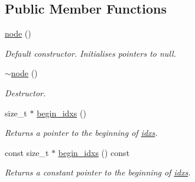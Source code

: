 \subsection*{Public Member Functions}
\begin{DoxyCompactItemize}
\item 
\mbox{\label{structphysim_1_1structures_1_1octree_1_1node_a635b012328b2533bb5ed7426a405629c}} 
\hyperlink{structphysim_1_1structures_1_1octree_1_1node_a635b012328b2533bb5ed7426a405629c}{node} ()
\begin{DoxyCompactList}\small\item\em Default constructor. Initialises pointers to null. \end{DoxyCompactList}\item 
\mbox{\label{structphysim_1_1structures_1_1octree_1_1node_a3a4c3b8ddc5369ddef78d72bc8f5782b}} 
\hyperlink{structphysim_1_1structures_1_1octree_1_1node_a3a4c3b8ddc5369ddef78d72bc8f5782b}{$\sim$node} ()
\begin{DoxyCompactList}\small\item\em Destructor. \end{DoxyCompactList}\item 
\mbox{\label{structphysim_1_1structures_1_1octree_1_1node_a27550f838cc161e335d23c530257424b}} 
size\+\_\+t $\ast$ \hyperlink{structphysim_1_1structures_1_1octree_1_1node_a27550f838cc161e335d23c530257424b}{begin\+\_\+idxs} ()
\begin{DoxyCompactList}\small\item\em Returns a pointer to the beginning of \hyperlink{structphysim_1_1structures_1_1octree_1_1node_ae365c35e35e5953164597fdb4264ab87}{idxs}. \end{DoxyCompactList}\item 
\mbox{\label{structphysim_1_1structures_1_1octree_1_1node_adf9df754e0b826b53c09e0c5a2c8deab}} 
const size\+\_\+t $\ast$ \hyperlink{structphysim_1_1structures_1_1octree_1_1node_adf9df754e0b826b53c09e0c5a2c8deab}{begin\+\_\+idxs} () const
\begin{DoxyCompactList}\small\item\em Returns a constant pointer to the beginning of \hyperlink{structphysim_1_1structures_1_1octree_1_1node_ae365c35e35e5953164597fdb4264ab87}{idxs}. \end{DoxyCompactList}\item 

\end{DoxyCompactItemize}
